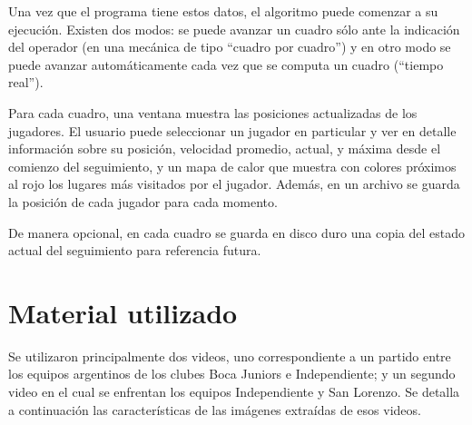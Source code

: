 Una vez que el programa tiene estos datos, el algoritmo puede comenzar a
su ejecución. Existen dos modos: se puede avanzar un cuadro sólo ante la
indicación del operador (en una mecánica de tipo ``cuadro por cuadro'') y en
otro modo se puede avanzar automáticamente cada vez que se computa un cuadro
(``tiempo real'').

Para cada cuadro, una ventana muestra las posiciones actualizadas de los
jugadores. El usuario puede seleccionar un jugador en particular y ver en
detalle información sobre su posición, velocidad promedio, actual, y máxima
desde el comienzo del seguimiento, y un mapa de calor que muestra con colores
próximos al rojo los lugares más visitados por el jugador. Además, en un
archivo se guarda la posición de cada jugador para cada momento.

De manera opcional, en cada cuadro se guarda en disco duro una copia del estado
actual del seguimiento para referencia futura.

\section{Material utilizado}

Se utilizaron principalmente dos videos, uno correspondiente a un partido entre
los equipos argentinos de los clubes Boca Juniors e Independiente; y un segundo
video en el cual se enfrentan los equipos Independiente y San Lorenzo. Se
detalla a continuación las características de las imágenes extraídas de esos
videos.

